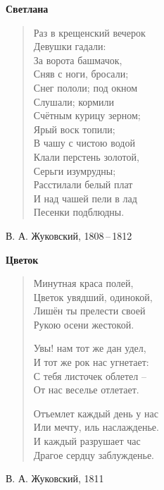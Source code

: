 \documentclass{beamer}
\begin{document}
\begin{frame}

\begin{center}
\textbf{Светлана}
\end{center}

\begin{verse}
Раз в крещенский вечерок\\
Девушки гадали:\\
За ворота башмачок,\\
Сняв с ноги, бросали;\\
Снег пололи; под окном\\
Слушали; кормили\\
Счётным курицу зерном;\\
Ярый воск топили;\\
В чашу с чистою водой\\
Клали перстень золотой,\\
Серьги изумрудны;\\
Расстилали белый плат\\
И над чашей пели в лад\\
Песенки подблюдны.

\end{verse}

В. А. Жуковский, 1808\,--\,1812

\end{frame}

\begin{frame}

\begin{center}
\textbf{Цветок}
\end{center}

\begin{verse}

Минутная краса полей,\\
Цветок увядший, одинокой,\\
Лишён ты прелести своей\\
Рукою осени жестокой.

	Увы! нам тот же дан удел,\\
И тот же рок нас угнетает:\\
С тебя листочек облетел –\\
От нас веселье отлетает.

	Отъемлет каждый день у нас\\
Или мечту, иль наслажденье.\\
И каждый разрушает час\\
Драгое сердцу заблужденье.


\end{verse}

В. А. Жуковский, 1811

\end{frame}
\end{document}
